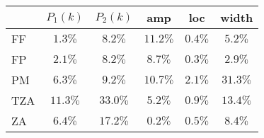 \begin{tabular}{lccccc}
	\hline \hline
	 & $P_1(k)$ & $P_2(k)$ & amp & loc & width \\ 
	\hline
	FF & $1.3\%$ & $8.2\%$ & $11.2\%$ & $0.4\%$ & $5.2\%$ \\
	FP & $2.1\%$ & $8.2\%$ & $8.7\%$ & $0.3\%$ & $2.9\%$ \\
	PM & $6.3\%$ & $9.2\%$ & $10.7\%$ & $2.1\%$ & $31.3\%$ \\
	TZA & $11.3\%$ & $33.0\%$ & $5.2\%$ & $0.9\%$ & $13.4\%$ \\
	ZA & $6.4\%$ & $17.2\%$ & $0.2\%$ & $0.5\%$ & $8.4\%$ \\
	\hline \hline
\end{tabular}

